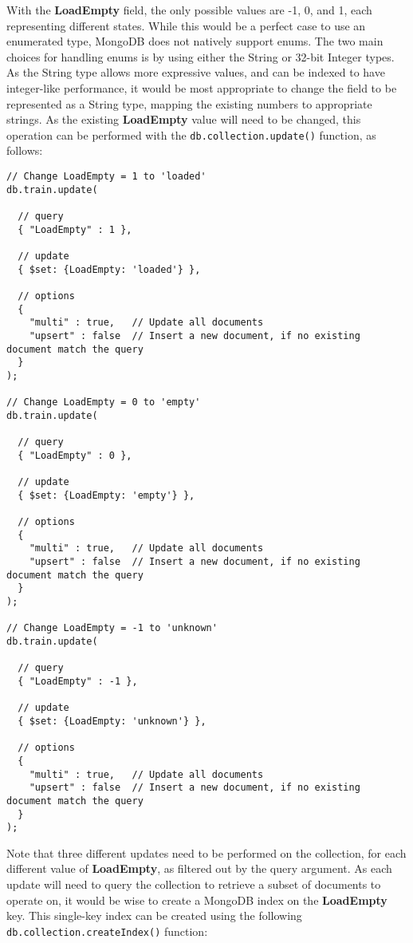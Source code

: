 \documentclass[a4paper,11pt]{article}
\begin{document}
With the \textbf{LoadEmpty} field, the only possible values are -1, 0, and 1, each representing different states. While
this would be a perfect case to use an enumerated type, MongoDB does not natively support enums. The two main choices
for handling enums is by using either the String or 32-bit Integer types. As the String type allows more expressive
values, and can be indexed to have integer-like performance, it would be most appropriate to change the field to be
represented as a String type, mapping the existing numbers to appropriate strings. As the existing \textbf{LoadEmpty}
value will need to be changed, this operation can be performed with the \texttt{db.collection.update()} function, as
follows:

\begin{lstlisting}
// Change LoadEmpty = 1 to 'loaded'
db.train.update(

  // query
  { "LoadEmpty" : 1 },

  // update
  { $set: {LoadEmpty: 'loaded'} },

  // options
  {
    "multi" : true,   // Update all documents
    "upsert" : false  // Insert a new document, if no existing document match the query
  }
);

// Change LoadEmpty = 0 to 'empty'
db.train.update(

  // query
  { "LoadEmpty" : 0 },

  // update
  { $set: {LoadEmpty: 'empty'} },

  // options
  {
    "multi" : true,   // Update all documents
    "upsert" : false  // Insert a new document, if no existing document match the query
  }
);

// Change LoadEmpty = -1 to 'unknown'
db.train.update(

  // query
  { "LoadEmpty" : -1 },

  // update
  { $set: {LoadEmpty: 'unknown'} },

  // options
  {
    "multi" : true,   // Update all documents
    "upsert" : false  // Insert a new document, if no existing document match the query
  }
);
\end{lstlisting}

Note that three different updates need to be performed on the collection, for each different value of \textbf{LoadEmpty},
as filtered out by the query argument. As each update will need to query the collection to retrieve a subset of documents
to operate on, it would be wise to create a MongoDB index on the \textbf{LoadEmpty} key. This single-key index can be
created using the following \texttt{db.collection.createIndex()} function:
\end{document}
